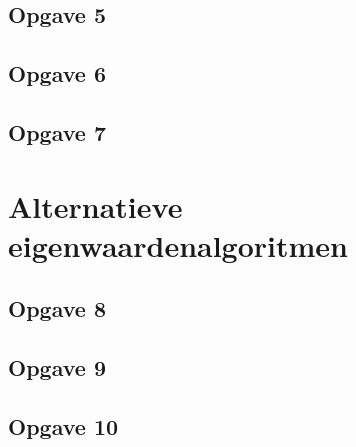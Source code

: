 \documentclass[a4paper, 12pt, titlepage]{report}
\begin{document}
\subsection{Opgave 5}

\subsection{Opgave 6}

\subsection{Opgave 7}

\section{Alternatieve eigenwaardenalgoritmen}

\subsection{Opgave 8}

\subsection{Opgave 9}

\subsection{Opgave 10}
\end{document}
